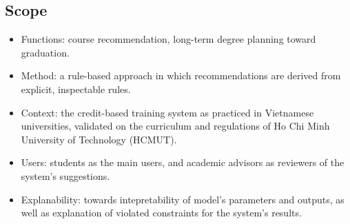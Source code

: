    \subsection{Scope}
\begin{itemize}
    \item Functions: course recommendation, long-term degree planning toward graduation.
    \item Method: a rule-based approach in which recommendations are derived from explicit, inspectable rules.
    \item Context: the credit-based training system as practiced in Vietnamese universities, validated on the curriculum and regulations of Ho Chi Minh University of Technology (HCMUT).
    \item Users: students as the main users, and academic advisors as reviewers of the system's suggestions.

    \item Explanability: towards intepretability of model's parameters and outputs, as well as explanation of violated constraints for the system's results.
\end{itemize}

